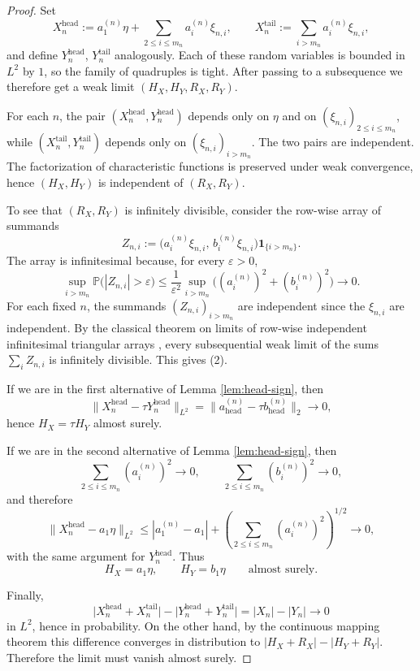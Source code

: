 \documentclass[11pt]{amsart}
\begin{document}
\begin{proof}
Set
\[
X_n^{\mathrm{head}} := a_1^{(n)}\eta + \sum_{2 \le i \le m_n} a_i^{(n)} \xi_{n,i},
\qquad
X_n^{\mathrm{tail}} := \sum_{i > m_n} a_i^{(n)} \xi_{n,i},
\]
and define $Y_n^{\mathrm{head}}$, $Y_n^{\mathrm{tail}}$ analogously.
Each of these random variables is bounded in $L^2$ by $1$, so the family of
quadruples is tight. After passing to a subsequence we therefore get a weak
limit $(H_X,H_Y,R_X,R_Y)$.

For each $n$, the pair
$(X_n^{\mathrm{head}},Y_n^{\mathrm{head}})$ depends only on $\eta$ and on
$(\xi_{n,i})_{2 \le i \le m_n}$, while
$(X_n^{\mathrm{tail}},Y_n^{\mathrm{tail}})$ depends only on
$(\xi_{n,i})_{i > m_n}$. The two pairs are independent. The factorization of
characteristic functions is preserved under weak convergence, hence
$(H_X,H_Y)$ is independent of $(R_X,R_Y)$.

To see that $(R_X,R_Y)$ is infinitely divisible, consider the row-wise array of
summands
\[
Z_{n,i}
:=
\bigl(a_i^{(n)} \xi_{n,i},\, b_i^{(n)} \xi_{n,i}\bigr)\mathbf{1}_{\{i>m_n\}}.
\]
The array is infinitesimal because, for every $\varepsilon>0$,
\[
\sup_{i>m_n}
\mathbb P\bigl(|Z_{n,i}|>\varepsilon\bigr)
\le
\frac{1}{\varepsilon^2}
\sup_{i>m_n}\bigl((a_i^{(n)})^2+(b_i^{(n)})^2\bigr)
\longrightarrow 0.
\]
For each fixed $n$, the summands $(Z_{n,i})_{i > m_n}$ are independent since
the $\xi_{n,i}$ are independent. By the classical theorem on limits of
row-wise independent infinitesimal triangular arrays
\cite[Chapter~4]{gnedenko-kolmogorov}, every subsequential weak limit of the
sums $\sum_i Z_{n,i}$ is infinitely divisible.
This gives (2).

If we are in the first alternative of Lemma \ref{lem:head-sign}, then
\[
\|X_n^{\mathrm{head}} - \tau Y_n^{\mathrm{head}}\|_{L^2}
=
\|a^{(n)}_{\mathrm{head}} - \tau b^{(n)}_{\mathrm{head}}\|_2
\longrightarrow 0,
\]
hence $H_X = \tau H_Y$ almost surely.

If we are in the second alternative of Lemma \ref{lem:head-sign}, then
\[
\sum_{2 \le i \le m_n} (a_i^{(n)})^2
\longrightarrow 0,
\qquad
\sum_{2 \le i \le m_n} (b_i^{(n)})^2
\longrightarrow 0,
\]
and therefore
\[
\|X_n^{\mathrm{head}} - a_1 \eta\|_{L^2}
\le
|a_1^{(n)}-a_1|
+
\left(\sum_{2 \le i \le m_n} (a_i^{(n)})^2\right)^{1/2}
\longrightarrow 0,
\]
with the same argument for $Y_n^{\mathrm{head}}$. Thus
\[
H_X = a_1 \eta,
\qquad
H_Y = b_1 \eta
\qquad
\text{almost surely.}
\]

Finally,
\[
\bigl|X_n^{\mathrm{head}} + X_n^{\mathrm{tail}}\bigr|
-
\bigl|Y_n^{\mathrm{head}} + Y_n^{\mathrm{tail}}\bigr|
=
|X_n|-|Y_n|
\longrightarrow 0
\]
in $L^2$, hence in probability. On the other hand, by the continuous mapping
theorem this difference converges in distribution to
$|H_X+R_X|-|H_Y+R_Y|$. Therefore the limit must vanish almost surely.
\end{proof}
\end{document}

